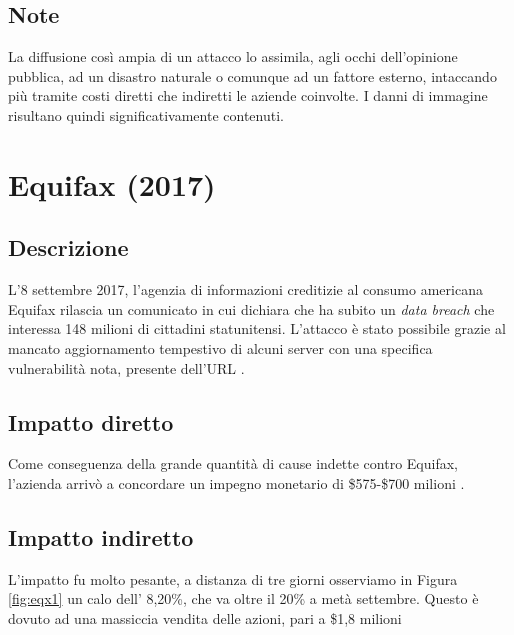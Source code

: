 \documentclass[12pt,a4paper,twoside]{report}
\begin{document}
\subsection{Note}

La diffusione cos\`i ampia di un attacco lo assimila, agli occhi dell'opinione pubblica, ad un disastro naturale o comunque ad un fattore esterno, intaccando pi\`u tramite costi diretti che indiretti le aziende coinvolte. I danni di immagine risultano quindi significativamente contenuti.

\section{Equifax (2017)}
\subsection{Descrizione}
L'8 settembre 2017, l'agenzia di informazioni creditizie al consumo americana Equifax rilascia un comunicato in cui dichiara che ha subito un \textit{data breach} che interessa  148 milioni di cittadini statunitensi. L'attacco \`e stato possibile grazie al mancato aggiornamento tempestivo di alcuni server con una specifica vulnerabilit\`a nota, presente dell'URL \cite{Equifax_case_study_2}.\\
\subsection{Impatto diretto}
Come conseguenza della grande quantit\`a di cause indette contro Equifax, l'azienda arriv\`o a concordare un impegno monetario di \$575-\$700 milioni \cite{Equifax_settlement}.\\
\subsection{Impatto indiretto}
L'impatto fu molto pesante, a distanza di tre giorni osserviamo in Figura \ref{fig:eqx1} \cite{macrotrends_equifax} un calo dell' 8,20\%, che va oltre il 20\% a met\`a settembre. Questo \`e dovuto ad una massiccia vendita delle azioni, pari a \$1,8 milioni \cite{Uber_plusEquifaxAndYahoo}\\
\end{document}
